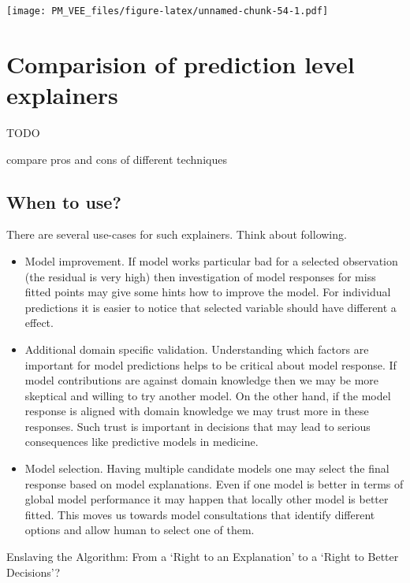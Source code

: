 \documentclass[]{krantz}
\providecommand{\tightlist}{%
  \setlength{\itemsep}{0pt}\setlength{\parskip}{0pt}}
\theoremstyle{definition}
\theoremstyle{definition}
\theoremstyle{definition}
\theoremstyle{remark}
\begin{document}
\texttt{[image: PM\_VEE\_files/figure-latex/unnamed-chunk-54-1.pdf]}

\hypertarget{comparision-of-prediction-level-explainers}{%
\section{Comparision of prediction level
explainers}\label{comparision-of-prediction-level-explainers}}

TODO

compare pros and cons of different techniques

\hypertarget{when-to-use}{%
\subsection{When to use?}\label{when-to-use}}

There are several use-cases for such explainers. Think about following.

\begin{itemize}
\tightlist
\item
  Model improvement. If model works particular bad for a selected
  observation (the residual is very high) then investigation of model
  responses for miss fitted points may give some hints how to improve
  the model. For individual predictions it is easier to notice that
  selected variable should have different a effect.
\item
  Additional domain specific validation. Understanding which factors are
  important for model predictions helps to be critical about model
  response. If model contributions are against domain knowledge then we
  may be more skeptical and willing to try another model. On the other
  hand, if the model response is aligned with domain knowledge we may
  trust more in these responses. Such trust is important in decisions
  that may lead to serious consequences like predictive models in
  medicine.
\item
  Model selection. Having multiple candidate models one may select the
  final response based on model explanations. Even if one model is
  better in terms of global model performance it may happen that locally
  other model is better fitted. This moves us towards model
  consultations that identify different options and allow human to
  select one of them.
\end{itemize}

Enslaving the Algorithm: From a `Right to an Explanation' to a `Right to
Better Decisions'? \citep{Edwards_Veale_2018}
\end{document}
